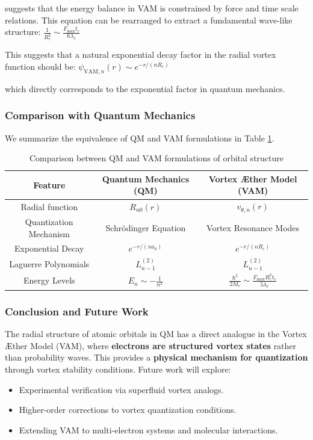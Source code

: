 \documentclass[a4paper,10pt]{article}
\renewcommand{\arraystretch}{1.5}
\begin{document}
suggests that the energy balance in VAM is constrained by force and time scale relations. This equation can be rearranged to extract a fundamental wave-like structure:
$\frac{1}{R_c^2} \sim \frac{F_{\max} t_c}{\hbar \lambda_c}$

This suggests that a natural exponential decay factor in the radial vortex function should be:
$\psi_{\text{VAM},n}(r) \sim e^{-r / (n R_c)}$


which directly corresponds to the exponential factor in quantum mechanics.

\subsubsection{Comparison with Quantum Mechanics}
We summarize the equivalence of QM and VAM formulations in Table \ref{tab:qm_vam}.

\begin{table}[h]
    \centering
    \renewcommand{\arraystretch}{1.3}
    \begin{tabular}{|c|c|c|}
        \hline
        \textbf{Feature} & \textbf{Quantum Mechanics (QM)} & \textbf{Vortex Æther Model (VAM)} \\
        \hline
        Radial function & \( R_{n0}(r) \) & \( v_{\theta, n}(r) \) \\
        \hline
        Quantization Mechanism & Schrödinger Equation & Vortex Resonance Modes \\
        \hline
        Exponential Decay & \( e^{-r / (n a_0)} \) & \( e^{-r / (n R_c)} \) \\
        \hline
        Laguerre Polynomials & \( L_{n-1}^{(2)} \) & \( L_{n-1}^{(2)} \) \\
        \hline
        Energy Levels & \( E_n \sim -\frac{1}{n^2} \) & \( \frac{\hbar^2}{2M_e} \sim \frac{F_{\max} R_c^2 t_c}{5 \lambda_c} \) \\
        \hline
    \end{tabular}
    \caption{Comparison between QM and VAM formulations of orbital structure}
    \label{tab:qm_vam}
\end{table}

\subsubsection{Conclusion and Future Work}
The radial structure of atomic orbitals in QM has a direct analogue in the Vortex Æther Model (VAM), where \textbf{electrons are structured vortex states} rather than probability waves. This provides a \textbf{physical mechanism for quantization} through vortex stability conditions. Future work will explore:
\begin{itemize}
    \item Experimental verification via superfluid vortex analogs.
    \item Higher-order corrections to vortex quantization conditions.
    \item Extending VAM to multi-electron systems and molecular interactions.
\end{itemize}
\end{document}
